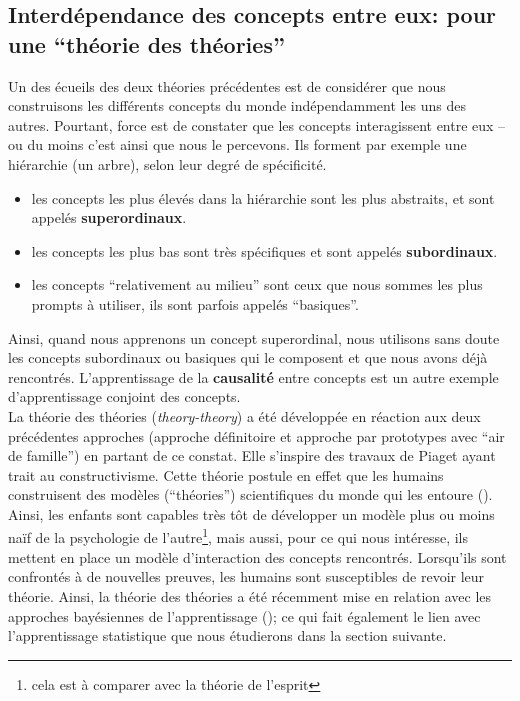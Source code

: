 \documentclass[french]{article}
\begin{document}
			\subsection{Interdépendance des concepts entre eux: pour une ``théorie des théories''}
				Un des écueils des deux théories précédentes est de considérer que nous construisons les différents concepts du monde indépendamment les uns des autres. Pourtant, force est de constater que les concepts interagissent entre eux -- ou du moins c'est ainsi que nous le percevons. Ils forment par exemple une hiérarchie (un arbre), selon leur degré de spécificité.
				\begin{itemize}
					\item les concepts les plus élevés dans la hiérarchie sont les plus abstraits, et sont appelés \textbf{superordinaux}.
					\item les concepts les plus bas sont très spécifiques et sont appelés \textbf{subordinaux}.
					\item les concepts ``relativement au milieu'' sont ceux que nous sommes les plus prompts à utiliser, ils sont parfois appelés ``basiques''.
				\end{itemize}
				Ainsi, quand nous apprenons un concept superordinal, nous utilisons sans doute les concepts subordinaux ou basiques qui le composent et que nous avons déjà rencontrés. L'apprentissage de la \textbf{causalité} entre concepts est un autre exemple d'apprentissage conjoint des concepts.\\
				
				La théorie des théories (\textit{theory-theory}) a été développée en réaction aux deux précédentes approches (approche définitoire et approche par prototypes avec ``air de famille'') en partant de ce constat. Elle s'inspire des travaux de Piaget ayant trait au constructivisme. Cette théorie postule en effet que les humains construisent des modèles (``théories'') scientifiques du monde qui les entoure (\cite{gopnik2012}). Ainsi, les enfants sont capables très tôt de développer un modèle plus ou moins naïf de la psychologie de l'autre\footnote{cela est à comparer avec la théorie de l'esprit}, mais aussi, pour ce qui nous intéresse, ils mettent en place un modèle d'interaction des concepts rencontrés. Lorsqu'ils sont confrontés à de nouvelles preuves, les humains sont susceptibles de revoir leur théorie. Ainsi, la théorie des théories a été récemment mise en relation avec les approches bayésiennes de l'apprentissage (\cite{gopnik2012}); ce qui fait également le lien avec l'apprentissage statistique que nous étudierons dans la section suivante.\\
				
\end{document}
